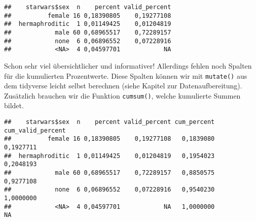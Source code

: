 \documentclass[
]{book}
\newenvironment{Shaded}{\begin{snugshade}}{\end{snugshade}}
\newcommand{\AttributeTok}[1]{\textcolor[rgb]{0.77,0.63,0.00}{#1}}
\newcommand{\CommentTok}[1]{\textcolor[rgb]{0.56,0.35,0.01}{\textit{#1}}}
\newcommand{\FunctionTok}[1]{\textcolor[rgb]{0.00,0.00,0.00}{#1}}
\newcommand{\NormalTok}[1]{#1}
\newcommand{\SpecialCharTok}[1]{\textcolor[rgb]{0.00,0.00,0.00}{#1}}
\begin{document}
\begin{Shaded}
\end{Shaded}

\begin{verbatim}
##    starwars$sex  n    percent valid_percent
##          female 16 0,18390805    0,19277108
##  hermaphroditic  1 0,01149425    0,01204819
##            male 60 0,68965517    0,72289157
##            none  6 0,06896552    0,07228916
##            <NA>  4 0,04597701            NA
\end{verbatim}

Schon sehr viel übersichtlicher und informativer! Allerdings fehlen noch Spalten für die kumulierten Prozentwerte. Diese Spalten können wir mit \texttt{mutate()} aus dem tidyverse leicht selbst berechnen (siehe Kapitel zur Datenaufbereitung). Zusätzlich brauchen wir die Funktion \texttt{cumsum()}, welche kumulierte Summen bildet.

\begin{Shaded}
\end{Shaded}

\begin{verbatim}
##    starwars$sex  n    percent valid_percent cum_percent cum_valid_percent
##          female 16 0,18390805    0,19277108   0,1839080         0,1927711
##  hermaphroditic  1 0,01149425    0,01204819   0,1954023         0,2048193
##            male 60 0,68965517    0,72289157   0,8850575         0,9277108
##            none  6 0,06896552    0,07228916   0,9540230         1,0000000
##            <NA>  4 0,04597701            NA   1,0000000                NA
\end{verbatim}
\end{document}
